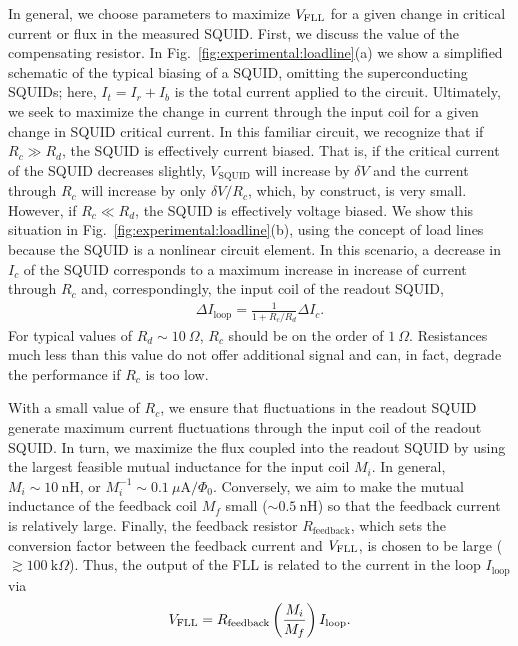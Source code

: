 In general, we choose parameters to maximize $V_\text{FLL}$ for a given change in critical current or flux in the measured SQUID. First, we discuss the value of the compensating resistor. In Fig.~\ref{fig:experimental:loadline}(a) we show a simplified schematic of the typical biasing of a SQUID, omitting the superconducting SQUIDs; here, $I_t = I_r + I_b$ is the total current applied to the circuit. Ultimately, we seek to maximize the change in current through the input coil for a given change in SQUID critical current. In this familiar circuit, we recognize that if $R_c \gg R_d$, the SQUID is effectively current biased. That is, if the critical current of the SQUID decreases slightly, $V_{\text{SQUID}}$ will increase by $\delta V$ and the current through $R_c$ will increase by only $\delta V/R_c$, which, by construct, is very small. However, if $R_c \ll R_d$, the SQUID is effectively voltage biased. We show this situation in Fig.~\ref{fig:experimental:loadline}(b), using the concept of load lines because the SQUID is a nonlinear circuit element. In this scenario, a decrease in $I_c$ of the SQUID corresponds to a maximum increase in increase of current through $R_c$ and, correspondingly, the input coil of the readout SQUID,
\begin{align}\label{fig:experimental:dIloop_dIc}
\Delta I_{\text{loop}} = \frac{1}{1+R_c/R_d} \Delta I_c.
\end{align}
For typical values of $R_d \sim 10~\Omega$, $R_c$ should be on the order of $1~\Omega$. Resistances much less than this value do not offer additional signal and can, in fact, degrade the performance if $R_c$ is too low.

With a small value of $R_c$, we ensure that fluctuations in the readout SQUID generate maximum current fluctuations through the input coil of the readout SQUID. In turn, we maximize the flux coupled into the readout SQUID by using the largest feasible mutual inductance for the input coil $M_i$. In general, $M_i \sim 10~\text{nH}$, or $M_i^{-1} \sim 0.1~\mu\text{A}/\Phi_0$. Conversely, we aim to make the mutual inductance of the feedback coil $M_f$ small ($\sim 0.5~$nH) so that the feedback current is relatively large. Finally, the feedback resistor $R_{\text{feedback}}$, which sets the conversion factor between the feedback current and $V_\text{FLL}$, is chosen to be large ($\gtrsim 100~\text{k}\Omega$). Thus, the output of the FLL is related to the current in the loop $I_{\text{loop}}$ via
\begin{align}\label{fig:experimental:Vfll_Iloop}
V_\text{FLL} = R_{\text{feedback}} \left( \frac{M_i}{M_f} \right) I_{\text{loop}}.
\end{align}

